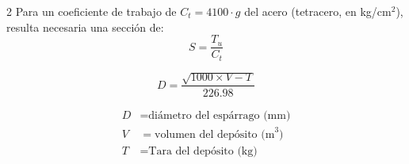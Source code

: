 \documentclass[11pt]{article}
\begin{document}
\begin{multicols*}{2}
    Para un coeficiente de trabajo de $C_t = 4100 \cdot g$ del acero (tetracero, en kg/cm$^2$), resulta necesaria una sección de:
    \begin{equation*}
        S = \frac{T_u}{C_t}
    \end{equation*}

    \begin{equation*}
        D = \frac{\sqrt{1000 \times V -T}}{226.98}
    \end{equation*}

    \begin{minipage}{\linewidth}
        \scriptsize
        \begin{align*}
            D &= \text{diámetro del espárrago (mm)} \\
            V &= \text{volumen del depósito (m}^3\text{)} \\
            T &= \text{Tara del depósito (kg)} \\
        \end{align*}
    \end{minipage}

\end{multicols*}
\end{document}
